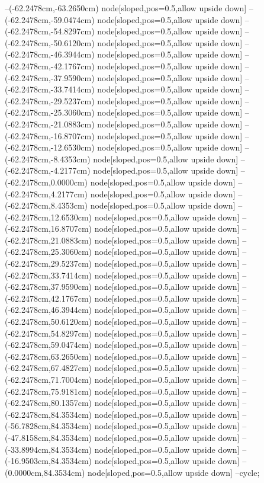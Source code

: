 --(-62.2478cm,-63.2650cm) node[sloped,pos=0.5,allow upside down]{\ArrowIn}
--(-62.2478cm,-59.0474cm) node[sloped,pos=0.5,allow upside down]{\ArrowIn}
--(-62.2478cm,-54.8297cm) node[sloped,pos=0.5,allow upside down]{\ArrowIn}
--(-62.2478cm,-50.6120cm) node[sloped,pos=0.5,allow upside down]{\ArrowIn}
--(-62.2478cm,-46.3944cm) node[sloped,pos=0.5,allow upside down]{\ArrowIn}
--(-62.2478cm,-42.1767cm) node[sloped,pos=0.5,allow upside down]{\ArrowIn}
--(-62.2478cm,-37.9590cm) node[sloped,pos=0.5,allow upside down]{\ArrowIn}
--(-62.2478cm,-33.7414cm) node[sloped,pos=0.5,allow upside down]{\ArrowIn}
--(-62.2478cm,-29.5237cm) node[sloped,pos=0.5,allow upside down]{\ArrowIn}
--(-62.2478cm,-25.3060cm) node[sloped,pos=0.5,allow upside down]{\ArrowIn}
--(-62.2478cm,-21.0883cm) node[sloped,pos=0.5,allow upside down]{\ArrowIn}
--(-62.2478cm,-16.8707cm) node[sloped,pos=0.5,allow upside down]{\ArrowIn}
--(-62.2478cm,-12.6530cm) node[sloped,pos=0.5,allow upside down]{\ArrowIn}
--(-62.2478cm,-8.4353cm) node[sloped,pos=0.5,allow upside down]{\ArrowIn}
--(-62.2478cm,-4.2177cm) node[sloped,pos=0.5,allow upside down]{\ArrowIn}
--(-62.2478cm,0.0000cm) node[sloped,pos=0.5,allow upside down]{\ArrowIn}
--(-62.2478cm,4.2177cm) node[sloped,pos=0.5,allow upside down]{\ArrowIn}
--(-62.2478cm,8.4353cm) node[sloped,pos=0.5,allow upside down]{\ArrowIn}
--(-62.2478cm,12.6530cm) node[sloped,pos=0.5,allow upside down]{\ArrowIn}
--(-62.2478cm,16.8707cm) node[sloped,pos=0.5,allow upside down]{\ArrowIn}
--(-62.2478cm,21.0883cm) node[sloped,pos=0.5,allow upside down]{\ArrowIn}
--(-62.2478cm,25.3060cm) node[sloped,pos=0.5,allow upside down]{\ArrowIn}
--(-62.2478cm,29.5237cm) node[sloped,pos=0.5,allow upside down]{\ArrowIn}
--(-62.2478cm,33.7414cm) node[sloped,pos=0.5,allow upside down]{\ArrowIn}
--(-62.2478cm,37.9590cm) node[sloped,pos=0.5,allow upside down]{\ArrowIn}
--(-62.2478cm,42.1767cm) node[sloped,pos=0.5,allow upside down]{\ArrowIn}
--(-62.2478cm,46.3944cm) node[sloped,pos=0.5,allow upside down]{\ArrowIn}
--(-62.2478cm,50.6120cm) node[sloped,pos=0.5,allow upside down]{\ArrowIn}
--(-62.2478cm,54.8297cm) node[sloped,pos=0.5,allow upside down]{\ArrowIn}
--(-62.2478cm,59.0474cm) node[sloped,pos=0.5,allow upside down]{\ArrowIn}
--(-62.2478cm,63.2650cm) node[sloped,pos=0.5,allow upside down]{\ArrowIn}
--(-62.2478cm,67.4827cm) node[sloped,pos=0.5,allow upside down]{\ArrowIn}
--(-62.2478cm,71.7004cm) node[sloped,pos=0.5,allow upside down]{\ArrowIn}
--(-62.2478cm,75.9181cm) node[sloped,pos=0.5,allow upside down]{\ArrowIn}
--(-62.2478cm,80.1357cm) node[sloped,pos=0.5,allow upside down]{\ArrowIn}
--(-62.2478cm,84.3534cm) node[sloped,pos=0.5,allow upside down]{\ArrowIn}
--(-56.7828cm,84.3534cm) node[sloped,pos=0.5,allow upside down]{\ArrowIn}
--(-47.8158cm,84.3534cm) node[sloped,pos=0.5,allow upside down]{\ArrowIn}
--(-33.8994cm,84.3534cm) node[sloped,pos=0.5,allow upside down]{\ArrowIn}
--(-16.9503cm,84.3534cm) node[sloped,pos=0.5,allow upside down]{\ArrowIn}
--(0.0000cm,84.3534cm) node[sloped,pos=0.5,allow upside down]{\ArrowIn}
--cycle;
